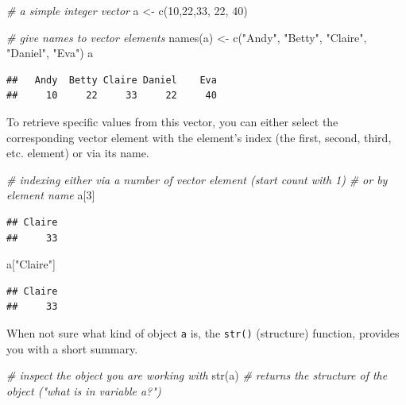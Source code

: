 \documentclass[
  12pt,
]{style/krantz}
\newenvironment{Shaded}{\begin{snugshade}}{\end{snugshade}}
\newcommand{\CommentTok}[1]{\textcolor[rgb]{0.56,0.35,0.01}{\textit{#1}}}
\newcommand{\DecValTok}[1]{\textcolor[rgb]{0.00,0.00,0.81}{#1}}
\newcommand{\FunctionTok}[1]{\textcolor[rgb]{0.00,0.00,0.00}{#1}}
\newcommand{\NormalTok}[1]{#1}
\newcommand{\OtherTok}[1]{\textcolor[rgb]{0.56,0.35,0.01}{#1}}
\newcommand{\StringTok}[1]{\textcolor[rgb]{0.31,0.60,0.02}{#1}}
\begin{document}
\begin{Shaded}
\begin{Highlighting}[]
\CommentTok{\# a simple integer vector}
\NormalTok{a }\OtherTok{\textless{}{-}} \FunctionTok{c}\NormalTok{(}\DecValTok{10}\NormalTok{,}\DecValTok{22}\NormalTok{,}\DecValTok{33}\NormalTok{, }\DecValTok{22}\NormalTok{, }\DecValTok{40}\NormalTok{)}

\CommentTok{\# give names to vector elements}
\FunctionTok{names}\NormalTok{(a) }\OtherTok{\textless{}{-}} \FunctionTok{c}\NormalTok{(}\StringTok{"Andy"}\NormalTok{, }\StringTok{"Betty"}\NormalTok{, }\StringTok{"Claire"}\NormalTok{, }\StringTok{"Daniel"}\NormalTok{, }\StringTok{"Eva"}\NormalTok{)}
\NormalTok{a}
\end{Highlighting}
\end{Shaded}

\begin{verbatim}
##   Andy  Betty Claire Daniel    Eva 
##     10     22     33     22     40
\end{verbatim}

To retrieve specific values from this vector, you can either select the corresponding vector element with the element's index (the first, second, third, etc. element) or via its name.

\begin{Shaded}
\begin{Highlighting}[]
\CommentTok{\# indexing either via a number of vector element (start count with 1)}
\CommentTok{\# or by element name}
\NormalTok{a[}\DecValTok{3}\NormalTok{]}
\end{Highlighting}
\end{Shaded}

\begin{verbatim}
## Claire 
##     33
\end{verbatim}

\begin{Shaded}
\begin{Highlighting}[]
\NormalTok{a[}\StringTok{"Claire"}\NormalTok{]}
\end{Highlighting}
\end{Shaded}

\begin{verbatim}
## Claire 
##     33
\end{verbatim}

When not sure what kind of object \texttt{a} is, the \texttt{str()} (structure) function, provides you with a short summary.

\begin{Shaded}
\begin{Highlighting}[]
\CommentTok{\# inspect the object you are working with}
\FunctionTok{str}\NormalTok{(a) }\CommentTok{\# returns the structure of the object ("what is in variable a?")}
\end{Highlighting}
\end{Shaded}
\end{document}
